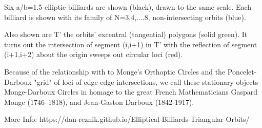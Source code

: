 Six a/b=1.5 elliptic billiards are shown (black), drawn to the same scale. Each billiard is shown with its family of N=3,4,....8, non-intersecting orbits (blue).

Also shown are T' the orbits' excentral (tangential) polygons (solid green). It turns out the intersection of segment (i,i+1) in T' with the reflection of segment (i+1,i+2) about the origin sweeps out circular loci (red). 

Because of the relationship with to Monge's Orthoptic Circles and the Poncelet-Darboux "grid" of loci of edge-edge intersections, we call these stationary objects Monge-Darboux Circles in homage to the great French Mathematicians Gaspard Monge (1746–1818), and Jean-Gaston Darboux (1842-1917).

More Info: https://dan-reznik.github.io/Elliptical-Billiards-Triangular-Orbits/